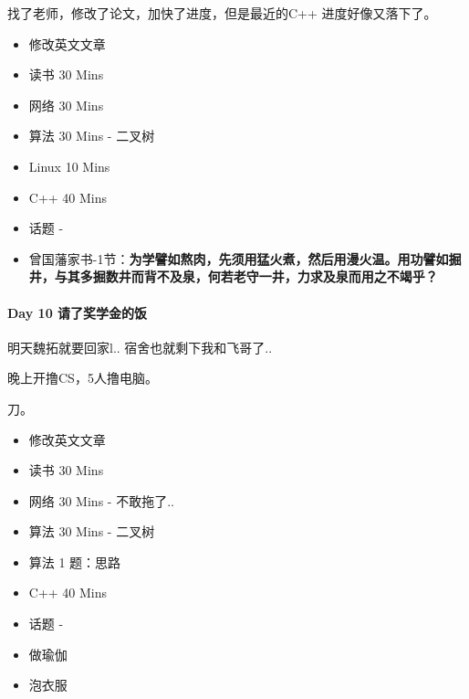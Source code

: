 \documentclass[UTF8,a4paper,8pt]{ctexart}
\begin{document}
		 找了老师，修改了论文，加快了进度，但是最近的C++ 进度好像又落下了。
		  \begin{itemize}
		  	\item  \makebox[0pt][l]{$\square$}\raisebox{.15ex}{\hspace{0.1em}$\checkmark$}修改英文文章
		  	
		  	\item  \makebox[0pt][l]{$\square$}\raisebox{.15ex}{\hspace{0.1em}$\checkmark$}读书  30 Mins
		  	\item  网络  30 Mins		 	
		  	\item  算法  30 Mins	- 二叉树
		  	\item  Linux 10 Mins
		  	\item  C++   40 Mins
		  	
		  	\item  话题 - 
		  	\item  \makebox[0pt][l]{$\square$}\raisebox{.15ex}{\hspace{0.1em}$\checkmark$}曾国藩家书-1节：\textbf{为学譬如熬肉，先须用猛火煮，然后用漫火温。用功譬如掘井，与其多掘数井而背不及泉，何若老守一井，力求及泉而用之不竭乎？}
		  \end{itemize}
	 \paragraph{Day 10   请了奖学金的饭   \quad     }
		 明天魏拓就要回家l.. 宿舍也就剩下我和飞哥了..
		 
		 晚上开撸CS，5人撸电脑。
		 
		 刀。
		 \begin{itemize}
		 	\item  \makebox[0pt][l]{$\square$}\raisebox{.15ex}{\hspace{0.1em}$\checkmark$}修改英文文章
		 	
		 	\item  \makebox[0pt][l]{$\square$}\raisebox{.15ex}{\hspace{0.1em}$\checkmark$}读书  30 Mins
		 	\item  网络  30 Mins	- 不敢拖了..	 	
		 	\item  算法  30 Mins	- 二叉树
		 	\item  算法  1 题：思路
		 	\item  \makebox[0pt][l]{$\square$}\raisebox{.15ex}{\hspace{0.1em}$\checkmark$}C++   40 Mins
		 	
		 	\item  话题 - 
		 	\item  做瑜伽
		 	\item  泡衣服
		 \end{itemize}
\end{document}

